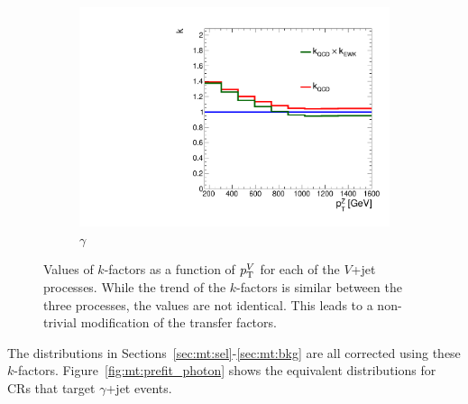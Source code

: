 \begin{figure}[]
\begin{center}
\begin{subfigure}[t]{0.32\textwidth}
            \includegraphics[width=\textwidth]{figures/monotop/kfactors/acorr_ptv.pdf}
            \caption{$\gamma$}
        \end{subfigure}
        \caption{Values of $k$-factors as a function of $p_\mathrm{T}^{V}$ for each of the $V$+jet processes.
                 While the trend of the $k$-factors is similar between the three processes, the values are not identical.
                 This leads to a non-trivial modification of the transfer factors.}
        \label{fig:mt:vlonlo}
    \end{center}
\end{figure}

The distributions in Sections~\ref{sec:mt:sel}-\ref{sec:mt:bkg} are all corrected using these $k$-factors.
Figure~\ref{fig:mt:prefit_photon} shows the equivalent distributions for CRs that target $\gamma$+jet events.


